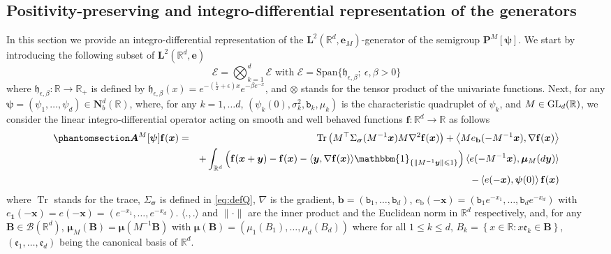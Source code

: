 \documentclass[12pt]{amsart}
\newcommand{\hlabel}{\phantomsection\label}
\numberwithin{equation}{section}
\newcommand{\bb}{\mathbb}
\newcommand{\cc}{\mathcal}
\renewcommand{\le}{\leqslant}
\newcommand{\tr}{\operatorname{Tr}}
\newcommand{\nab}{\nabla}
\newcommand{\mf}{\mathfrak}
\newcommand{\bbm}{\mathbbm}
\newcommand{\ttt}{\mathtt}
\newcommand{\bmrm}[2][2]{\mathbf{#2}^{#1}}
\newcommand{\Span}{\mathrm{Span}}
\newcommand{\AM}{\bm{A}^M}
\newcommand{\eps}{\epsilon}
\newcommand{\heb}{\mf{h}_{\eps,\beta}}
\newcommand{\f}{\mathbf{f}}
\theoremstyle{definition}
\theoremstyle{assump}
\theoremstyle{remark}
\begin{document}
\subsection{Positivity-preserving and integro-differential representation of the generators} In this section we provide an integro-differential representation of  the $\bmrm{L}(\bb R^d,\mathbf{e}_M)$-generator of the semigroup $\bm{P}^M[\bm{\psi}]$. We start by introducing the following subset of $\bmrm{L}(\bb R^d,\mathbf{e})$
\begin{equation}
		\bm{\cc{E}}=\bigotimes_{k=1}^d\cc{E} \mbox{ with }  \cc{E}=\Span\{\heb;\: \epsilon,\beta>0\}
\end{equation}
where $\heb: \bb{R} \to \bb{R}_+$ is defined by $\heb(x)=e^{-(\frac{1}{2}+\epsilon)x}e^{-\beta e^{-x}}$, and $\otimes$ stands for the tensor product of the univariate functions. Next, for any $\bm{\psi}=(\psi_1,\ldots,\psi_d)\in\mathbf{N}^d_b(\bb{R})$, where, for any $k=1,\ldots d$, $(\psi_k(0),\sigma_k^2,\ttt{b}_k,\mu_k)$ is the characteristic quadruplet of $\psi_k$,  and $M \in {\rm{GL}}_d(\bb{R})$, we consider the linear integro-differential operator acting on smooth and well behaved functions $\f: \bb{R}^d \to \bb{R}$ as follows
\begin{eqnarray}\hlabel{eq:fourier_int}
	\AM[\bm{\psi}]\f(\bm{x})&=&\tr\left({M}^\top \Sigma_{\bm{\sigma}}({M}^{-1}\bm{x}) {M}\nab^2 \f(\bm{x})\right)+\left\langle {M}e_{\bm{\mathrm b}}(-{M}^{-1}\bm{x}),\nab \f(\bm{x})\right\rangle  \nonumber \\
	& &+\int_{\bb{R}^d}\left(\f(\bm{x}+\bm{y})-\f(\bm{x})-\langle\bm{y},\nab \f(\bm{x})\rangle\bbm{1}_{\{\|{M}^{-1}\bm{y}\|\le 1 \}}\right)\langle e(-{M}^{-1}\bm{x}),\bm{\mu}_M(d\bm{y})\rangle \\
&& - \left\langle e(-\bm{x}),\bm{\psi}(0)\right\rangle\f(\bm{x})  \nonumber %
\end{eqnarray}
where $\tr$ stands for the trace, $\Sigma_{\bm{\sigma}}$ is defined in \eqref{eq:defQ}, $\nab$ is the gradient, $\mathbf{b}=(\ttt{b}_1,\ldots,\ttt{b}_d)$, $e_{\bm{\mathrm b}}(-\bm{x})=(\ttt{b}_1e^{-x_1},\ldots, \ttt{b}_de^{-x_d})$ with $e_\mathbf{1}(-\bm{x})=e(-\bm x)=(e^{-x_1},\ldots, e^{-x_d})$. $\langle .,.\rangle$ and $\|\cdot\|$ are  the inner product and the Euclidean norm in $\bb{R}^d$ respectively, and,
for any $\bm{B} \in\cc{B}(\bb{R}^d)$, $\bm{\mu}_M(\bm{B})=\bm{\mu}({M}^{-1}\bm{B})$ with $\bm{\mu}(\bm{B})=(\mu_1(B_1),\ldots, \mu_d(B_d))$ where for all $1\le k\le d$, $B_k=\left\{x\in\bb{R}: x\mf{e}_k\in\bm{B}\right\}$, $(\mf{e}_1,\ldots,\mf{e}_d)$ being the canonical basis of $\bb{R}^d$.
\end{document}
